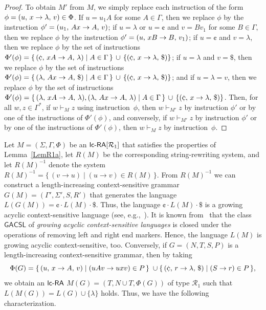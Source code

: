 \begin{proof}
To obtain $M'$ from $M$, we simply replace each instruction of the form $\phi=(u,\,x\rightarrow\lambda,\,v)\in \Phi$. If $u=u_1A$ for some $A\in\Gamma$, then we replace $\phi$ by the instruction $\phi'=(u_1,\,Ax\rightarrow A,\,v)$; if $u=\lambda$ or $u=\cent$ and $v=Bv_1$ for some $B\in\Gamma$, then we replace $\phi$ by the instruction $\phi'=(u,\,xB\rightarrow B,\,v_1)$; if $u =\cent$ and $v=\lambda$, then we replace $\phi$ by the set of instructions $\Phi'(\phi) = \{\,\rarule{\cent}{xA}{A}{\lambda}\mid A\in \Gamma\,\} \,\cup\,\{\rarule{\cent}{x}{\lambda}{\$}\}$; if $u=\lambda$ and $v=\$$, then we replace $\phi$ by the set of instructions $\Phi'(\phi) = \{\,\rarule{\lambda}{Ax}{A}{\$}\mid A\in \Gamma\,\} \,\cup\,\{\rarule{\cent}{x}{\lambda}{\$}\}$; and if $u=\lambda=v$, then we replace $\phi$ by the set of instructions $\Phi'(\phi) = \{\,\rarule{\lambda}{xA}{A}{\lambda},\rarule{\lambda}{Ax}{A}{\lambda}\mid A\in \Gamma\,\} \,\cup\,\{\rarule{\cent}{x}{\lambda}{\$}\}$. Then, for all $w,z\in\Gamma^*$, if $w\vdash_M z$ using instruction~$\phi$, then $w\vdash_{M'} z$ by instruction $\phi'$ or by one of the instructions of $\Phi'(\phi)$, and conversely, if $w\vdash_{M'} z$ by instruction $\phi'$ or by one of the instructions of $\Phi'(\phi)$, then $w\vdash_M z$ by instruction~$\phi$.
\end{proof}

Let $M=(\Sigma,\Gamma,\Phi)$ be an $\lcRA[1]$ that satisfies the properties of Lemma~\ref{LemR1a}, let $R(M)$ be the corresponding string-rewriting system, and let $R(M)^{-1}$ denote the system $R(M)^{-1} = \{\,(v\to u) \mid (u\to v)\in R(M)\,\}.$ From $R(M)^{-1}$ we can construct a length-increasing context-sensitive grammar $G(M) = (\Gamma',\Sigma',S,R')$ that generates the language $L(G(M)) = \cent\cdot L(M)\cdot\$$. Thus, the language $\cent\cdot L(M)\cdot\$$ is a growing acyclic context-sensitive language  (see, e.g.,~\cite{NiWo01}). It is known from~\cite{BunHabil} that the class $\mathsf{GACSL}$ of \emph{growing acyclic context-sensitive languages} is closed under the operations of removing left and right end markers. Hence, the language $L(M)$ is growing acyclic context-sensitive, too. Conversely, if $G=(N,T,S,P)$ is a length-increasing context-sensitive grammar, then by taking
$$
\Phi(G)  =  \{\,\rarule{u}{x}{A}{v} \mid (uAv\to uxv)\in P\,\}\; \cup
            \{\,\rarule{\cent}{r}{\lambda}{\$}\mid (S\to r)\in P\,\},
$$
we obtain an $\lcRA$ $M(G) = (T,N\cup T,\Phi(G))$ of type $\mathcal{R}_1$ such that $L(M(G)) = L(G)\cup\{\lambda\}$ holds. Thus,  we have the following characterization.

